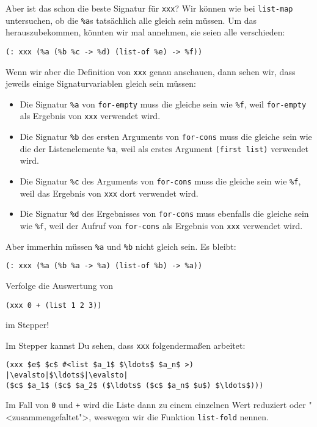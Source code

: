 Aber ist das schon die beste Signatur für \lstinline{xxx}?  Wir können
wie bei \lstinline{list-map} untersuchen, ob die \lstinline{%a}s
tatsächlich alle gleich sein müssen.  Um das herauszubekommen, könnten
wir mal annehmen, sie seien alle verschieden:
\begin{lstlisting}
(: xxx (%a (%b %c -> %d) (list-of %e) -> %f))
\end{lstlisting}
%
Wenn wir aber die Definition von \lstinline{xxx} genau anschauen, dann
sehen wir, dass jeweils einige Signaturvariablen gleich sein müssen:
%
\begin{itemize}
\item Die Signatur \lstinline{%a} von \lstinline{for-empty} muss die
  gleiche sein wie \lstinline{%f}, weil \lstinline{for-empty} als
  Ergebnis von \lstinline{xxx} verwendet wird.
\item Die Signatur \lstinline{%b} des ersten Arguments von
    \lstinline{for-cons} muss die gleiche sein wie die der
    Listenelemente \lstinline{%a}, weil als erstes Argument
      \lstinline{(first list)} verwendet wird.
\item Die Signatur \lstinline{%c} des Arguments von
    \lstinline{for-cons} muss die gleiche sein wie \lstinline{%f},
     weil das Ergebnis von \lstinline{xxx} dort verwendet wird.
\item Die Signatur \lstinline{%d} des Ergebnisses von
    \lstinline{for-cons} muss ebenfalls die gleiche sein wie
    \lstinline{%f}, weil der Aufruf von \lstinline{for-cons} als
    Ergebnis von \lstinline{xxx} verwendet wird.
\end{itemize}
%
Aber immerhin müssen \lstinline{%a} und \lstinline{%b} nicht gleich
sein.  Es bleibt:
%
\begin{lstlisting}
(: xxx (%a (%b %a -> %a) (list-of %b) -> %a))
\end{lstlisting}
%
\begin{aufgabeinline}
  Verfolge die Auswertung von
\begin{lstlisting}
(xxx 0 + (list 1 2 3))
\end{lstlisting}
  im Stepper!
\end{aufgabeinline}
%
Im Stepper kannst Du sehen, dass \lstinline{xxx} folgendermaßen
arbeitet:
%
\begin{lstlisting}
(xxx $e$ $c$ #<list $a_1$ $\ldots$ $a_n$ >)
|\evalsto|$\ldots$|\evalsto|
($c$ $a_1$ ($c$ $a_2$ ($\ldots$ ($c$ $a_n$ $u$) $\ldots$)))
\end{lstlisting}
%
Im Fall von \lstinline{0} und \lstinline{+} wird die Liste dann zu
einem einzelnen Wert reduziert oder "<zusammengefaltet">, weswegen wir
die Funktion \lstinline{list-fold} nennen.

